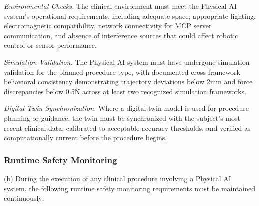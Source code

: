 \documentclass[11pt]{article}
\begin{document}
\begin{description}[leftmargin=1.0cm,style=sameline]
\item[(6)] \textit{Environmental Checks.} The clinical environment must meet the Physical AI system's operational requirements, including adequate space, appropriate lighting, electromagnetic compatibility, network connectivity for MCP server communication, and absence of interference sources that could affect robotic control or sensor performance.
\item[(7)] \textit{Simulation Validation.} The Physical AI system must have undergone simulation validation for the planned procedure type, with documented cross-framework behavioral consistency demonstrating trajectory deviations below 2mm and force discrepancies below 0.5N across at least two recognized simulation frameworks.
\item[(8)] \textit{Digital Twin Synchronization.} Where a digital twin model is used for procedure planning or guidance, the twin must be synchronized with the subject's most recent clinical data, calibrated to acceptable accuracy thresholds, and verified as computationally current before the procedure begins.
\end{description}

\subsubsection{Runtime Safety Monitoring}

(b) During the execution of any clinical procedure involving a Physical AI system, the following runtime safety monitoring requirements must be maintained continuously:
\end{document}
